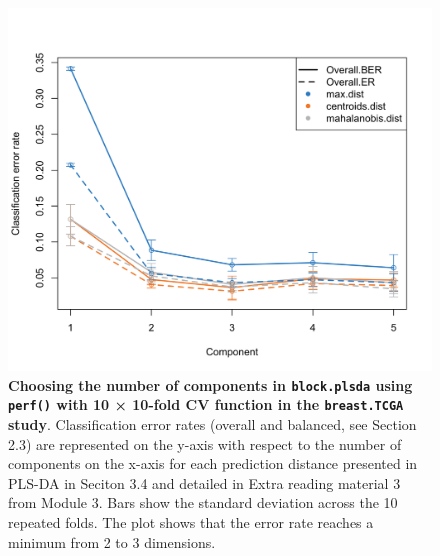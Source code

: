 \documentclass[]{book}
\newenvironment{Shaded}{\begin{snugshade}}{\end{snugshade}}
\newcommand{\CommentTok}[1]{\textcolor[rgb]{0.56,0.35,0.01}{\textit{#1}}}
\newcommand{\DataTypeTok}[1]{\textcolor[rgb]{0.13,0.29,0.53}{#1}}
\newcommand{\DecValTok}[1]{\textcolor[rgb]{0.00,0.00,0.81}{#1}}
\newcommand{\KeywordTok}[1]{\textcolor[rgb]{0.13,0.29,0.53}{\textbf{#1}}}
\newcommand{\NormalTok}[1]{#1}
\newcommand{\StringTok}[1]{\textcolor[rgb]{0.31,0.60,0.02}{#1}}
\begin{document}
\begin{Shaded}
\end{Shaded}

\begin{figure}

{\centering \includegraphics[width=0.5\linewidth]{Figures/DIABLO/diablo-perf-1} 

}

\caption{\textbf{Choosing the number of components in \texttt{block.plsda} using \texttt{perf()} with 10 × 10-fold CV function in the \texttt{breast.TCGA} study}. Classification error rates (overall and balanced, see Section 2.3) are represented on the y-axis with respect to the number of components on the x-axis for each prediction distance presented in PLS-DA in Seciton 3.4 and detailed in Extra reading material 3 from Module 3. Bars show the standard deviation across the 10 repeated folds. The plot shows that the error rate reaches a minimum from 2 to 3 dimensions.}\label{fig:diablo-perf}
\end{figure}
\end{document}
